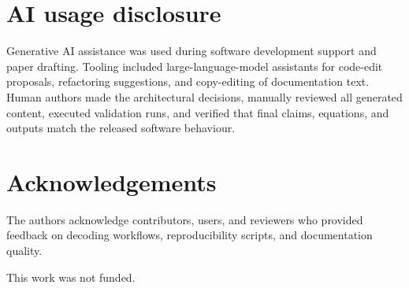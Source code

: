 \documentclass[
]{article}
\begin{document}
\section{AI usage disclosure}\label{ai-usage-disclosure}

Generative AI assistance was used during software development support
and paper drafting. Tooling included large-language-model assistants for
code-edit proposals, refactoring suggestions, and copy-editing of
documentation text. Human authors made the architectural decisions,
manually reviewed all generated content, executed validation runs, and
verified that final claims, equations, and outputs match the released
software behaviour.

\section{Acknowledgements}\label{acknowledgements}

The authors acknowledge contributors, users, and reviewers who provided
feedback on decoding workflows, reproducibility scripts, and
documentation quality.

This work was not funded.

\renewcommand\refname{References}

\end{document}
